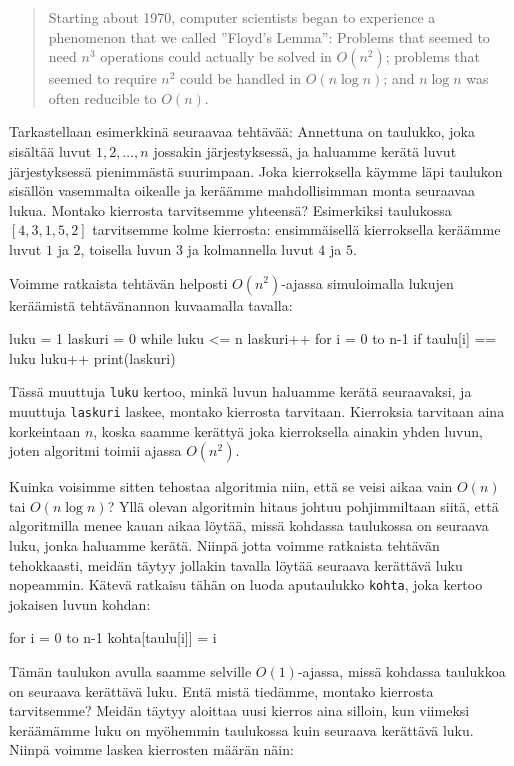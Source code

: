 \begin{quote}
Starting about 1970, computer scientists began to experience
a phenomenon that we called ''Floyd's Lemma'':
Problems that seemed to need $n^3$ operations could actually be
solved in $O(n^2)$; problems that seemed to require $n^2$
could be handled in $O(n \log n)$; and $n \log n$ was often
reducible to $O(n)$.
\end{quote}

Tarkastellaan esimerkkinä seuraavaa tehtävää:
Annettuna on taulukko, joka sisältää luvut $1,2,\dots,n$
jossakin järjestyksessä,
ja haluamme kerätä luvut järjestyksessä pienimmästä suurimpaan.
Joka kierroksella käym\-me läpi taulukon sisällön vasemmalta
oikealle ja keräämme mahdollisimman monta seuraavaa lukua.
Montako kierrosta tarvitsemme yhteensä?
Esimerkiksi taulukossa $[4,3,1,5,2]$
tarvitsemme kolme kierrosta:
ensimmäisellä kierroksella keräämme luvut $1$ ja $2$,
toisella luvun $3$ ja kolmannella luvut $4$ ja $5$.

Voimme ratkaista tehtävän helposti $O(n^2)$-ajassa
simuloimalla lukujen keräämistä tehtävänannon kuvaamalla tavalla:

\begin{code}
luku = 1
laskuri = 0
while luku <= n
    laskuri++
    for i = 0 to n-1
        if taulu[i] == luku
            luku++
print(laskuri)
\end{code}

Tässä muuttuja \texttt{luku} kertoo,
minkä luvun haluamme kerätä seuraavaksi,
ja muuttuja \texttt{laskuri} laskee,
montako kierrosta tarvitaan.
Kierroksia tarvitaan aina korkeintaan $n$,
koska saamme kerättyä joka kierroksella
ainakin yhden luvun,
joten algoritmi toimii ajassa $O(n^2)$.

Kuinka voisimme sitten tehostaa algoritmia niin,
että se veisi aikaa vain $O(n)$ tai $O(n \log n)$?
Yllä olevan algoritmin hitaus johtuu pohjimmiltaan siitä,
että algoritmilla menee kauan aikaa löytää,
missä kohdassa taulukossa on seuraava luku,
jonka haluamme kerätä.
Niinpä jotta voimme ratkaista tehtävän tehokkaasti,
meidän täytyy jollakin tavalla löytää seuraava kerät\-tävä luku nopeammin.
Kätevä ratkaisu tähän on luoda aputaulukko \texttt{kohta},
joka kertoo jokaisen luvun kohdan:

\begin{code}
for i = 0 to n-1
    kohta[taulu[i]] = i
\end{code}

Tämän taulukon avulla saamme selville $O(1)$-ajassa,
missä kohdassa taulukkoa on seuraava kerättävä luku.
Entä mistä tiedämme, montako kierrosta tarvitsemme?
Meidän täytyy aloittaa uusi kierros aina silloin,
kun viimeksi keräämämme luku on myöhemmin taulukossa
kuin seuraava kerättävä luku.
Niinpä voimme laskea kierrosten määrän näin:

